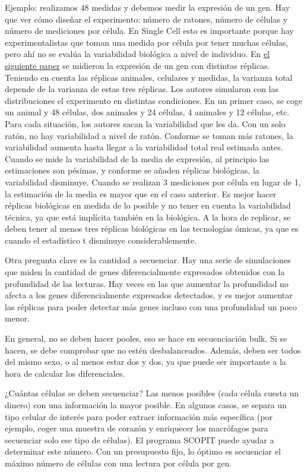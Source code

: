 Ejemplo: realizamos 48 medidas y debemos medir la expresión de un gen. Hay que ver cómo diseñar el experimento: número de ratones, número de células y número de mediciones por célula. En Single Cell esto es importante porque hay experimentalistas que toman una medida por célula por tener muchas células, pero ahí no se evalúa la variabilidad biológica a nivel de individuo. En  \href{https://www.nature.com/articles/nmeth.3091}{el siguiente paper} se midieron la expresión de un gen con distintas réplicas. Teniendo en cuenta las réplicas animales, celulares y medidas, la varianza total depende de la varianza de estas tres réplicas. Los autores simularon con las distribuciones el experimento en distintas condiciones. En un primer caso, se coge un animal y 48 células, dos animales y 24 células, 4 animales y 12 células, etc. Para cada situación, los autores sacan la variabilidad que les da. Con un solo ratón, no hay variabilidad a nivel de ratón. Conforme se toman más ratones, la variabilidad aumenta hasta llegar a la variabilidad total real estimada antes. Cuando se mide la variabilidad de la media de expresión, al principio las estimaciones son pésimas, y conforme se añaden réplicas biológicas, la variabilidad disminuye. Cuando se realizan 3 mediciones por célula en lugar de 1, la estimación de la media es mayor que en el caso anterior. Es mejor hacer réplicas biológicas en medida de lo posible y no tener en cuenta la variabilidad técnica, ya que está implícita también en la biológica. 
A la hora de replicar, se deben tener al menos tres réplicas biológicas en las tecnologías ómicas, ya que es cuando el estadístico t disminuye considerablemente. 

Otra pregunta clave es la cantidad a secuenciar. Hay una serie de simulaciones que miden la cantidad de genes diferencialmente expresados obtenidos con la profundidad de las lecturas. Hay veces en las que aumentar la profundidad no afecta a los genes diferencialmente expresados detectados, y es mejor aumentar las réplicas para poder detectar más genes incluso con una profundidad un poco menor. 

En general, no se deben hacer pooles, eso se hace en secuenciación bulk. Si se hacen, se debe comprobar que no estén desbalanceados. Además, deben ser todos del mismo sexo, o al menos estar dos y dos, ya que puede ser importante a la hora de calcular los diferenciales. 

¿Cuántas células se deben secuenciar? Las menos posibles (cada célula cuesta un dinero) con una información la mayor posible. En algunos casos, se separa un tipo celular de interés para poder extraer información más específica (por ejemplo, coger una muestra de corazón y enriquecer los macrófagos para secuenciar solo ese tipo de células). El programa SCOPIT puede ayudar a determinar este número. 
Con un presupuesto fijo, lo óptimo es secuenciar el máximo número de células con una lectura por célula por gen. 

